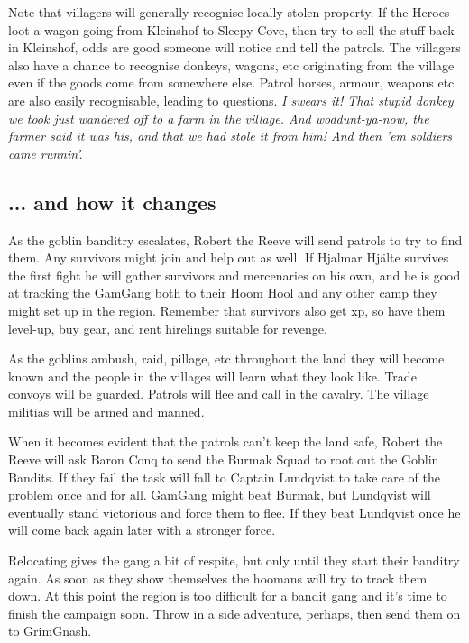 Note that villagers will generally recognise locally stolen property. If the Heroes loot a wagon going from Kleinshof to Sleepy Cove, then try to sell the stuff back in Kleinshof, odds are good someone will notice and tell the patrols. The villagers also have a chance to recognise donkeys, wagons, etc originating from the village even if the goods come from somewhere else. Patrol horses, armour, weapons etc are also easily recognisable, leading to questions.
\textit{I swears it! That stupid donkey we took just wandered off to a farm in the village. And woddunt-ya-now, the farmer said it was his, and that we had stole it from him! And then 'em soldiers came runnin'.}

\subsection*{... and how it changes}

As the goblin banditry escalates, Robert the Reeve will send patrols to try to find them. Any survivors might join and help out as well. If Hjalmar Hjälte survives the first fight he will gather survivors and mercenaries on his own, and he is good at tracking the GamGang both to their Hoom Hool and any other camp they might set up in the region. Remember that survivors also get xp, so have them level-up, buy gear, and rent hirelings suitable for revenge.

As the goblins ambush, raid, pillage, etc throughout the land they will become known and the people in the villages will learn what they look like. Trade convoys will be guarded. Patrols will flee and call in the cavalry. The village militias will be armed and manned.

When it becomes evident that the patrols can't keep the land safe, Robert the Reeve will ask Baron Conq to send the Burmak Squad to root out the Goblin Bandits. If they fail the task will fall to Captain Lundqvist to take care of the problem once and for all. GamGang might beat Burmak, but Lundqvist will eventually stand victorious and force them to flee. If they beat Lundqvist once he will come back again later with a stronger force.

Relocating gives the gang a bit of respite, but only until they start their banditry again. As soon as they show themselves the hoomans will try to track them down. At this point the region is too difficult for a bandit gang and it's time to finish the campaign soon. Throw in a side adventure, perhaps, then send them on to GrimGnash.


